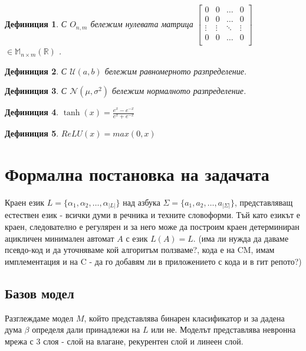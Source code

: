 \documentclass[a4paper,12pt]{article}
\newtheorem{defn}{Дефиниция}[section]
\begin{document}
\begin{defn}
С $O_{n,m}$ бележим нулевата матрица $\begin{bmatrix}
  0      & 0      & \dots  & 0 \\ 
  0      & 0      & \dots  & 0 \\ 
  \vdots & \vdots & \ddots & \vdots \\
  0      & 0      & \dots  & 0 \\ 
\end{bmatrix}$ $\in \mathbb{M}_{n \times m} (\mathbb{R})$ .
\end{defn}

\begin{defn}
С $\mathcal{U}(a,b)$ бележим равномерното разпределение.
\end{defn}

\begin{defn}
С $\mathcal{N}(\mu, \sigma^2)$ бележим нормалното разпределение.
\end{defn}

\begin{defn}
$\tanh(x) = \frac{e^x - e^{-x}}{e^x + e^{-x}}$
\end{defn}

\begin{defn} $ReLU(x)= max(0, x)$
\end{defn}

\pagebreak

\section{Формална постановка на задачата}

Краен език $L = \{\alpha_1, \alpha_2, \ldots, \alpha_{|L|}\}$ над азбука $\Sigma = \{a_1, a_2, \ldots, a_{|\Sigma|}\}$, представляващ естествен език - всички думи в речника и техните словоформи. Тъй като езикът е краен, следователно е регулярен и за него може да построим краен детерминиран ацикличен минимален автомат $A$ с език $L(A) = L$. (има ли нужда да даваме псевдо-код и да уточняваме кой алгоритъм ползваме?, кода е на CM, имам имплементация и на C - да го добавям ли в приложението с кода и в гит репото?)

\subsection{Базов модел}

Разглеждаме модел $M$, който представлява бинарен класификатор и за дадена дума $\beta$ определя дали принадлежи на $L$ или не. Моделът представлява невронна мрежа с 3 слоя - слой на влагане, рекурентен слой и  линеен слой.
\end{document}
